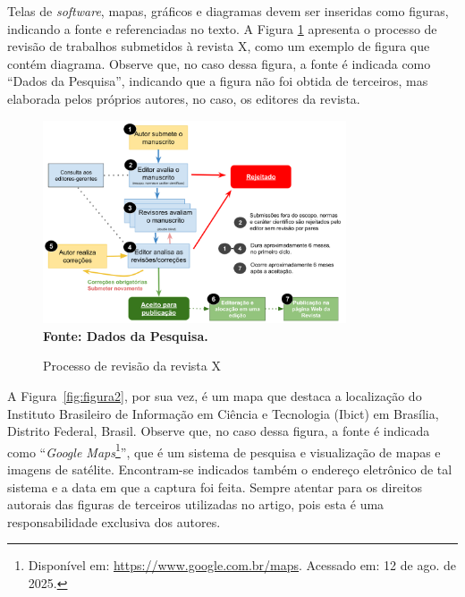 \documentclass[a4paper,12pt]{article}
\begin{document}
	Telas de \textit{software}, mapas, gráficos e diagramas devem ser inseridas como figuras, indicando a fonte e referenciadas no texto. A Figura \ref{fig:figura1} apresenta o processo de revisão de trabalhos submetidos à revista X, como um exemplo de figura que contém diagrama. Observe que, no caso dessa figura, a fonte é indicada como ``Dados da Pesquisa'', indicando que a figura não foi obtida de terceiros, mas elaborada pelos próprios autores, no caso, os editores da revista.
	
	\begin{figure}[htb]
		\centering	
		\caption[Processo de Revisão da Revista X.]{Processo de revisão da revista X}
		\label{fig:figura1}
		\includegraphics[width=0.8\textwidth]{figuras/review.png}\\
		\textbf{\footnotesize Fonte: Dados da Pesquisa.}
	\end{figure}
	
	A Figura~\ref{fig:figura2}, por sua vez, é um mapa que destaca a localização do Instituto Brasileiro de Informação em Ciência e Tecnologia (Ibict) em Brasília, Distrito Federal, Brasil. Observe que, no caso dessa figura, a fonte é indicada como “{\it Google Maps}\footnote{Disponível em: \url{https://www.google.com.br/maps}. Acessado em: 12 de ago. de 2025.}”, que é um sistema de pesquisa e visualização de mapas e imagens de satélite. Encontram-se indicados também o endereço eletrônico de tal sistema e a data em que a captura foi feita. Sempre atentar para os direitos autorais das figuras de terceiros utilizadas no artigo, pois esta é uma responsabilidade exclusiva dos autores.
	
\end{document}
